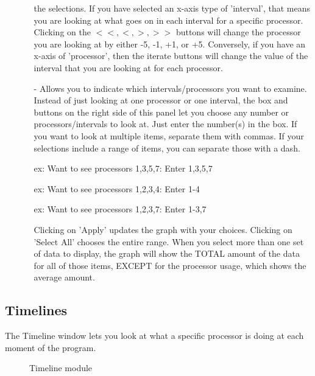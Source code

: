 \documentclass[10pt,dvips]{article}
\begin{document}
\begin{enumerate}
\begin{itemize}
        the selections.  If you have selected an x-axis type of 'interval',
        that means you are looking at what goes on in each interval for a
        specific processor.  Clicking on the $<<, <, >, >>$ buttons will change
        the processor you are looking at by either -5, -1, +1, or +5.
        Conversely, if you have an x-axis of 'processor', then the iterate
        buttons will change the value of the interval that you are looking at
        for each processor.
      \item[-]
        Allows you to indicate which intervals/processors you want to examine.
        Instead of just looking at one processor or one interval, the box and
        buttons on the right side of this panel let you choose any number or
        processors/intervals to look at.  Just enter the number(s) in the box.
        If you want to look at multiple items, separate them with commas.  If
        your selections include a range of items, you can separate those with
        a dash.

        ex: Want to see processors 1,3,5,7:  Enter 1,3,5,7

	ex: Want to see processors 1,2,3,4:  Enter 1-4

	ex: Want to see processors 1,2,3,7:  Enter 1-3,7

        Clicking on 'Apply' updates the graph with your choices.
        Clicking on 'Select All' chooses the entire range.  When you select more
        than one set of data to display, the graph will show the TOTAL amount of
        the data for all of those items, EXCEPT for the processor usage, which
        shows the average amount.
      \end{itemize}
    \end{enumerate}

\subsection{Timelines}

   The Timeline window lets you look at what a specific processor is doing at
   each moment of the program.

   \begin{figure}[htb]
   \center
   \caption{Timeline module}
   \label{timeline}
   \end{figure}
\end{document}
